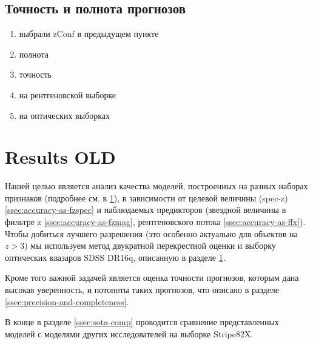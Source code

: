 \documentclass[fleqn,usenatbib]{mnras}
\begin{document}
\subsection{Точность и полнота прогнозов}
\begin{enumerate}
	\item выбрали zConf в предыдущем пункте
	\item полнота
	\item точность
	\item на рентгеновской выборке
	\item на оптических выборках
\end{enumerate}

\clearpage\clearpage\clearpage\clearpage
\clearpage
\section{Results OLD}



Нашей целью является анализ качества моделей, построенных на разных наборах признаков (подробнее см. в \ref{}), в зависимости от целевой величины (spec-z) \ref{ssec:accuracy-as-fzspec} и наблюдаемых предикторов (звездной величины в фильтре z \ref{ssec:accuracy-as-fzmag}, рентгеновского потока \ref{ssec:accuracy-as-ffx}). Чтобы добиться лучшего разрешения (это особенно актуально для объектов на $z > 3$) мы используем метод двукратной перекрестной оценки и выборку оптических квазаров SDSS DR16q, описанную в разделе \ref{}.

Кроме того важной задачей является оценка точности прогнозов, которым дана высокая уверенность, и потоноты таких прогнозов, что описано в разделе \ref{ssec:precision-and-completeness}.

В конце в разделе \ref{ssec:sota-comp} проводится сравнение представленных моделей с моделями других исследователей на выборке Stripe82X.

\end{document}
